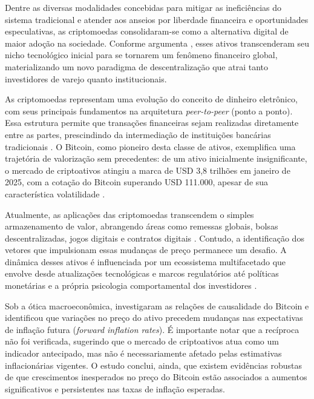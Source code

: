 \documentclass[
    12pt,                %
    openright,           %
    oneside,             %
    a4paper,             %
    english,             %
    brazil               %
]{abntex2}
\begin{document}
Dentre as diversas modalidades concebidas para mitigar as ineficiências do sistema tradicional e 
atender aos anseios por liberdade financeira e oportunidades especulativas, as criptomoedas 
consolidaram-se como a alternativa digital de maior adoção na sociedade. Conforme argumenta 
, esses ativos transcenderam seu nicho tecnológico inicial para se tornarem 
um fenômeno financeiro global, materializando um novo paradigma de descentralização que atrai tanto investidores de varejo 
quanto institucionais.

As criptomoedas representam uma evolução do conceito de dinheiro eletrônico, com seus principais fundamentos na arquitetura \textit{peer-to-peer} (ponto a ponto). 
Essa estrutura permite que transações financeiras sejam realizadas diretamente entre as partes, prescindindo da intermediação de instituições bancárias 
tradicionais \cite{CHUEN}. O Bitcoin, como pioneiro desta classe de ativos, exemplifica uma trajetória de valorização sem precedentes: de um ativo inicialmente 
insignificante, o mercado de criptoativos atingiu a marca de USD 3,8 trilhões em janeiro de 2025, com a cotação do Bitcoin superando USD 111.000, apesar de sua 
característica volatilidade \cite{CHEN}.

Atualmente, as aplicações das criptomoedas transcendem o simples armazenamento de valor, abrangendo áreas como remessas globais, bolsas descentralizadas, 
jogos digitais e contratos digitais \cite{CHUEN}. Contudo, a identificação dos vetores que impulsionam essas mudanças de preço permanece um desafio. 
A dinâmica desses ativos é influenciada por um ecossistema multifacetado que envolve desde atualizações tecnológicas e marcos regulatórios até políticas 
monetárias e a própria psicologia comportamental dos investidores \cite{CHEN}. 

Sob a ótica macroeconômica,  investigaram as relações de causalidade do Bitcoin e identificou que variações no preço do ativo precedem 
mudanças nas expectativas de inflação futura (\textit{forward inflation rates}). É importante notar que a recíproca não foi verificada, sugerindo que o mercado 
de criptoativos atua como um indicador antecipado, mas não é necessariamente afetado pelas estimativas inflacionárias vigentes. O estudo conclui, ainda, que 
existem evidências robustas de que crescimentos inesperados no preço do Bitcoin estão associados a aumentos significativos e persistentes nas taxas de inflação 
esperadas.
\end{document}
